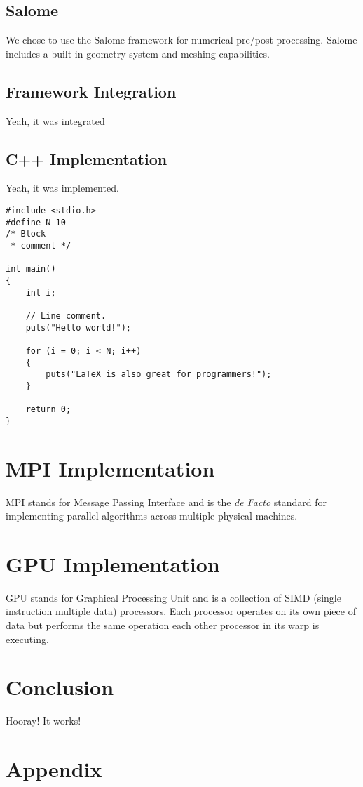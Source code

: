 \documentclass{article}
\numberwithin{equation}{subsection}
\begin{document}
\subsection{Salome}
We chose to use the Salome framework for numerical pre/post-processing. Salome includes a built in geometry system and meshing capabilities.

\subsection{Framework Integration}
Yeah, it was integrated

\subsection{C++ Implementation}
Yeah, it was implemented.

\begin{lstlisting}
#include <stdio.h>
#define N 10
/* Block
 * comment */

int main()
{
    int i;

    // Line comment.
    puts("Hello world!");
    
    for (i = 0; i < N; i++)
    {
        puts("LaTeX is also great for programmers!");
    }

    return 0;
}
\end{lstlisting}

\section{MPI Implementation}
MPI stands for Message Passing Interface and is the \textit{de Facto} standard for implementing parallel algorithms across multiple physical machines.

\section{GPU Implementation}
GPU stands for Graphical Processing Unit and is a collection of SIMD (single instruction multiple data) processors. Each processor operates on its own piece of data but performs the same operation each other processor in its warp is executing.

\section{Conclusion}
Hooray! It works!

\section{Appendix}
\end{document}
